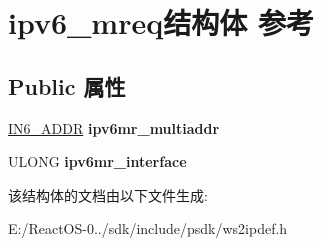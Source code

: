 \hypertarget{structipv6__mreq}{}\section{ipv6\+\_\+mreq结构体 参考}
\label{structipv6__mreq}
\subsection*{Public 属性}
\begin{DoxyCompactItemize}
\item 
\mbox{\label{structipv6__mreq_af410147275bcfbc8f4083ed8bab12547}} 
\hyperlink{structin6__addr}{I\+N6\+\_\+\+A\+D\+DR} {\bfseries ipv6mr\+\_\+multiaddr}
\item 
\mbox{\label{structipv6__mreq_a830910b7f88ff6b0b91819131723ac07}} 
U\+L\+O\+NG {\bfseries ipv6mr\+\_\+interface}
\end{DoxyCompactItemize}


该结构体的文档由以下文件生成\+:\begin{DoxyCompactItemize}
\item 
E\+:/\+React\+O\+S-\/0../sdk/include/psdk/ws2ipdef.\+h\end{DoxyCompactItemize}
